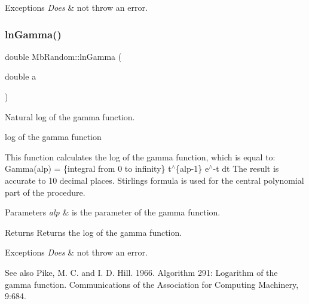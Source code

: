 \begin{DoxyExceptions}{Exceptions}
{\em Does} & not throw an error. \\
\hline
\end{DoxyExceptions}
\mbox{\label{class_mb_random_ae27b57bf2122981b6c589b6f39d0cf6c}} 
\subsubsection{\texorpdfstring{lnGamma()}{lnGamma()}}
{\footnotesize\ttfamily double Mb\+Random\+::ln\+Gamma (\begin{DoxyParamCaption}\item[{double}]{a }\end{DoxyParamCaption})}



Natural log of the gamma function. 

log of the gamma function

This function calculates the log of the gamma function, which is equal to\+: Gamma(alp) = \{integral from 0 to infinity\} t$^\wedge$\{alp-\/1\} e$^\wedge$-\/t dt The result is accurate to 10 decimal places. Stirling\textquotesingle{}s formula is used for the central polynomial part of the procedure.


\begin{DoxyParams}{Parameters}
{\em alp} & is the parameter of the gamma function. \\
\hline
\end{DoxyParams}
\begin{DoxyReturn}{Returns}
Returns the log of the gamma function. 
\end{DoxyReturn}

\begin{DoxyExceptions}{Exceptions}
{\em Does} & not throw an error. \\
\hline
\end{DoxyExceptions}
\begin{DoxySeeAlso}{See also}
Pike, M. C. and I. D. Hill. 1966. Algorithm 291\+: Logarithm of the gamma function. Communications of the Association for Computing Machinery, 9\+:684. 
\end{DoxySeeAlso}
\mbox{\label{class_mb_random_aa48ff75522fc4c5426af0133753ce19e}} 
